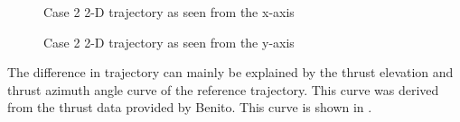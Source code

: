 \begin{figure}[H]
\centering
{}
\caption{Case 2 2-D trajectory as seen from the x-axis}
\label{fig:2PlotFigure1SeenFromXaxisZoom}
\end{figure}

\begin{figure}[H]
\centering
{}
\caption{Case 2 2-D trajectory as seen from the y-axis}
\label{fig:2PlotFigure1SeenFromYaxisZoom}
\end{figure}


The difference in trajectory can mainly be explained by the thrust elevation and thrust azimuth angle curve of the reference trajectory. This curve was derived from the thrust data provided by Benito. This curve is shown in . 

